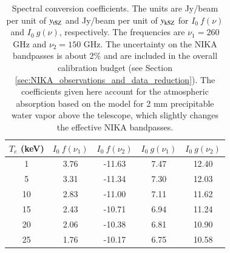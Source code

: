 \documentclass[twocolumn,traditabstract]{aa}
\begin{document}
\begin{table}[!ht]
\caption{\footnotesize{Spectral conversion coefficients. The units are Jy/beam per unit of $y_{\rm tSZ}$ and Jy/beam per unit of $y_{\rm kSZ}$ for $I_0 \ f(\nu)$ and $I_0 \ g(\nu)$, respectively. The frequencies are $\nu_1 = 260$ GHz and $\nu_2 = 150$ GHz. The uncertainty on the NIKA bandpasses is about 2\% \citep[see][for more details]{Adam2014} and are included in the overall calibration budget (see Section \ref{sec:NIKA_observations_and_data_reduction}). The coefficients given here account for the atmospheric absorption based on the \cite{Pardo2001} model for 2 mm precipitable water vapor above the telescope, which slightly changes the effective NIKA bandpasses.}}
\begin{center}
\begin{tabular}{ccccc}
\hline
\hline
$T_e$ (keV) & $I_0 \ f(\nu_1)$ & $I_0 \ f(\nu_2)$ & $I_0 \ g(\nu_1)$ & $I_0 \ g(\nu_2)$ \\
\hline
1   &  3.76 & -11.63 &  7.47 & 12.40 \\
5   &  3.31 & -11.34 &  7.30 & 12.03 \\
10  &  2.83 & -11.00 &  7.11 & 11.62 \\
15  &  2.43 & -10.71 &  6.94 & 11.24 \\
20  &  2.06 & -10.38 &  6.81 & 10.90 \\
25  &  1.76 & -10.17 &  6.75 & 10.58 \\
\hline
\end{tabular}
\end{center}
\label{tab:sz_coefficients}
\end{table}
\end{document}

